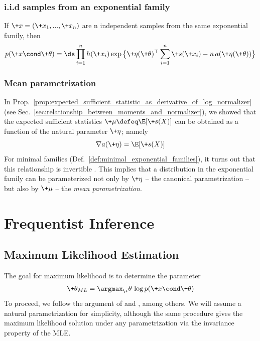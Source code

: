 \documentclass{article} %
\newcommand{\obs}{\+x}
\newcommand{\logNormalizerFunction}{a}
\newcommand{\sufficientStatsFunction}{\+s}
\newcommand{\carrierDensity}{h}
\newcommand{\meanParam}{\+\mu}
\newcommand{\param}{\+\theta}
\newcommand{\naturalParam}{\+\eta}
\begin{document}
\subsubsection{i.i.d samples from an exponential family} \label{sec:iid_samples_from_an_exponential_family}
If $\obs=(\obs_1, ..., \obs_n)$ are n independent samples from the same exponential family, then 
\begin{align}
\label{eqn:exponential_family_iid}
 p(\obs \cond \param) = \ds\prod_{i=1}^n \carrierDensity(\obs_i) \exp \big\{ \naturalParam(\param)^\top \sum_{i=1}^n \sufficientStatsFunction(\obs_i) - n \,\logNormalizerFunction(\naturalParam(\param))\big\} 
 \end{align}


\subsubsection{Mean parametrization} \label{sec:mean_parametrization}

In Prop.~\ref{prop:expected_sufficient_statistic_as_derivative_of_log_normalizer} (see Sec.~\ref{sec:relationship_between_moments_and_normalizer}), we showed that the expected sufficient statistics $\meanParam \defeq \E[\sufficientStatsFunction(X)]$ can be obtained as a function of the natural parameter $\naturalParam$; namely
%
\[ \nabla \logNormalizerFunction(\naturalParam) = \E[\sufficientStatsFunction(X)] \]
%
For minimal families (Def.~\ref{def:minimal_exponential_families}), it turns out that this relationship is invertible \cite[Sec.~8.4]{jordan2010exponential}.   This implies that a distribution in the exponential family can be parameterized not only by $\naturalParam$ -- the canonical parametrization -- but also by $\meanParam$ -- the \textit{mean parametrization}.   



\section{Frequentist Inference}

\subsection{Maximum Likelihood Estimation}
\label{sec:ml_with_ef}


The goal for maximum likelihood is to determine the parameter
%
\begin{align}
\param_{ML} = \argmax_\param  \, \log p(\+x \cond \param) 
\label{eqn:ml}
\end{align}
%
To proceed, we follow the argument of \citet{dempster1977maximum} and \citet{jordan2010exponential}, among others.   We will assume a natural parametrization for simplicity, although the same procedure gives the maximum likelihood solution under any parametrization via the invariance property of the MLE.
\end{document}
